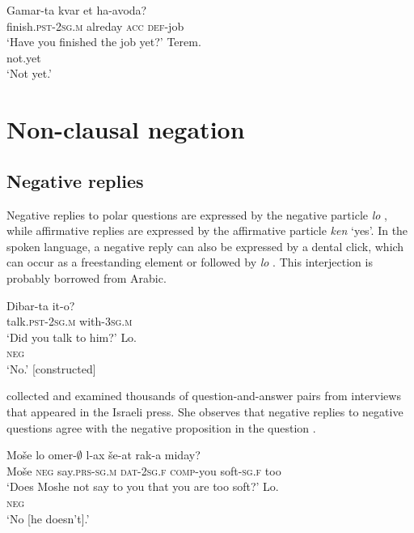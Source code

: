 \documentclass[output=paper,colorlinks,citecolor=brown]{langscibook}
\begin{document}
\ea\label{ex:heb:13c}
    \begin{xlist}[A: ]
            \gll  Gamar-ta kvar et ha-avoda?\\ 
                 finish.\textsc{pst-2sg.m} alreday \textsc{acc} \textsc{def}{}-job\\ 
            \glt ‘Have you finished the job yet?'
             \gll  Terem.\\ 
                    not.yet\\
             \glt ‘Not yet.' \citep[335]{Tzivoni1993} 
    \end{xlist}
\z 

\section{Non-clausal negation} \label{sec:heb:3}
\subsection{Negative replies} \label{sec:heb:3.1}

Negative replies to polar questions are expressed by the negative particle \textit{lo} , while affirmative replies are expressed by the affirmative particle \textit{ken} ‘yes’. In the spoken language, a negative reply can also be expressed by a dental click, which can occur as a freestanding element or followed by \textit{lo} \citep[614--615]{Shor2020}. This interjection is probably borrowed from Arabic.

\ea\label{ex:heb:14}
    \begin{xlist}[A: ]
    \label{ex:heb:14a}
        \gll Dibar-ta it-o? \\
            talk.\textsc{pst-2sg.m} with-\textsc{3sg.m} \\
        \glt ‘Did you talk to him?' 
    \label{ex:heb:14b}
        \gll Lo.\\
            \textsc{neg} \\
        \glt ‘No.’ [constructed]
    \end{xlist}
\z 

\citet{Burstein1999} collected and examined thousands of question-and-answer pairs from interviews that appeared in the Israeli press. She observes that negative replies to negative questions agree with the negative proposition in the question .

\ea\label{ex:heb:15}
    \begin{xlist}[A: ]
    \label{ex:heb:15A}
        \gll  Moše lo omer-${\emptyset}$ l-ax še-at rak-a miday?\\ 
              Moše \textsc{neg} say.\textsc{prs-sg.m} \textsc{dat-2sg.f} \textsc{comp{}-}you soft-\textsc{sg.f} too\\ 
        \glt ‘Does Moshe not say to you that you are too soft?'
    \label{ex:heb:15B}
        \gll  Lo.\\ 
               \textsc{neg}\\
        \glt ‘No [he doesn’t].’
    \end{xlist}
\z 
\end{document}
